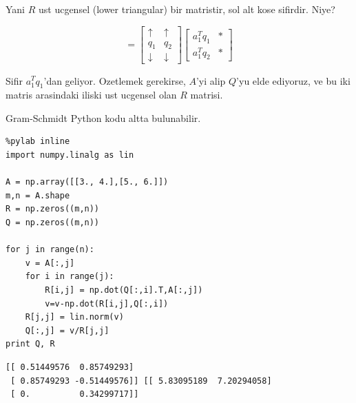 \documentclass[12pt,fleqn]{article}\usepackage{../common}
\begin{document}
Yani $R$ ust ucgensel (lower triangular) bir matristir, sol alt kose
sifirdir. Niye? 

\[ 
=
\left[\begin{array}{rrr}
\uparrow &  \uparrow \\
q_1 &  q_2 \\
\downarrow &  \downarrow 
\end{array}\right]
\left[\begin{array}{rrr}
a_1^Tq_1 &  * \\
a_1^Tq_2 &  *
\end{array}\right]
 \]

Sifir $a_1^Tq_1$'dan geliyor. Ozetlemek gerekirse, $A$'yi alip $Q$'yu elde
ediyoruz, ve bu iki matris arasindaki iliski ust ucgensel olan $R$
matrisi. 

Gram-Schmidt Python kodu altta bulunabilir.

\begin{verbatim}
%pylab inline
import numpy.linalg as lin

A = np.array([[3., 4.],[5., 6.]])
m,n = A.shape
R = np.zeros((m,n))
Q = np.zeros((m,n))

for j in range(n):
    v = A[:,j]
    for i in range(j):
        R[i,j] = np.dot(Q[:,i].T,A[:,j])
        v=v-np.dot(R[i,j],Q[:,i])
    R[j,j] = lin.norm(v)
    Q[:,j] = v/R[j,j]
print Q, R
\end{verbatim}

\begin{verbatim}
[[ 0.51449576  0.85749293]
 [ 0.85749293 -0.51449576]] [[ 5.83095189  7.20294058]
 [ 0.          0.34299717]]
\end{verbatim}
\end{document}
